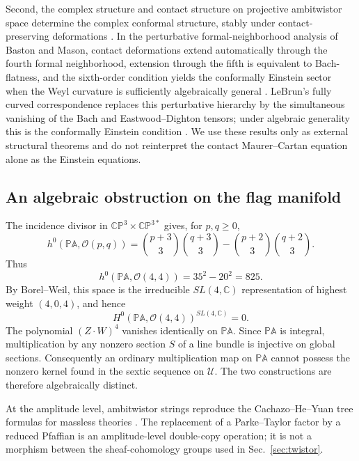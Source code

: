 \documentclass[aps,prd,reprint,nofootinbib,superscriptaddress]{revtex4-2}
\theoremstyle{definition}
\theoremstyle{remark}
\newcommand{\C}{\mathbb{C}}
\newcommand{\CP}{\mathbb{CP}}
\begin{document}
Second, the complex structure and contact structure on projective ambitwistor space determine the complex conformal structure, stably under contact-preserving deformations \cite{LeBrun1983,AtiyahDunajskiMason2017}.  In the perturbative formal-neighborhood analysis of Baston and Mason, contact deformations extend automatically through the fourth formal neighborhood, extension through the fifth is equivalent to Bach-flatness, and the sixth-order condition yields the conformally Einstein sector when the Weyl curvature is sufficiently algebraically general \cite{BastonMason1987}.  LeBrun's fully curved correspondence replaces this perturbative hierarchy by the simultaneous vanishing of the Bach and Eastwood--Dighton tensors; under algebraic generality this is the conformally Einstein condition \cite{LeBrun1991}.  We use these results only as external structural theorems and do not reinterpret the contact Maurer--Cartan equation alone as the Einstein equations.

\subsection{An algebraic obstruction on the flag manifold}

The incidence divisor in $\CP^3\times\CP^{3*}$ gives, for $p,q\ge0$,
\begin{equation}
 h^0\!\left(\mathbb{PA},\mathcal O(p,q)\right)
 =\binom{p+3}{3}\binom{q+3}{3}
 -\binom{p+2}{3}\binom{q+2}{3}.
 \label{eq:PAh0}
\end{equation}
Thus
\begin{equation}
 h^0\!\left(\mathbb{PA},\mathcal O(4,4)\right)
 =35^2-20^2=825.
 \label{eq:PA44dim}
\end{equation}
By Borel--Weil, this space is the irreducible $SL(4,\C)$ representation of highest weight $(4,0,4)$, and hence
\begin{equation}
 H^0\!\left(\mathbb{PA},\mathcal O(4,4)\right)^{SL(4,\C)}=0.
 \label{eq:noPAinvariant}
\end{equation}
The polynomial $(Z\cdot W)^4$ vanishes identically on $\mathbb{PA}$.  Since $\mathbb{PA}$ is integral, multiplication by any nonzero section $S$ of a line bundle is injective on global sections.  Consequently an ordinary multiplication map on $\mathbb{PA}$ cannot possess the nonzero kernel found in the sextic sequence on $\mathcal U$.  The two constructions are therefore algebraically distinct.

At the amplitude level, ambitwistor strings reproduce the Cachazo--He--Yuan tree formulas for massless theories \cite{MasonSkinner2014}.  The replacement of a Parke--Taylor factor by a reduced Pfaffian is an amplitude-level double-copy operation; it is not a morphism between the sheaf-cohomology groups used in Sec.~\ref{sec:twistor}.
\end{document}

